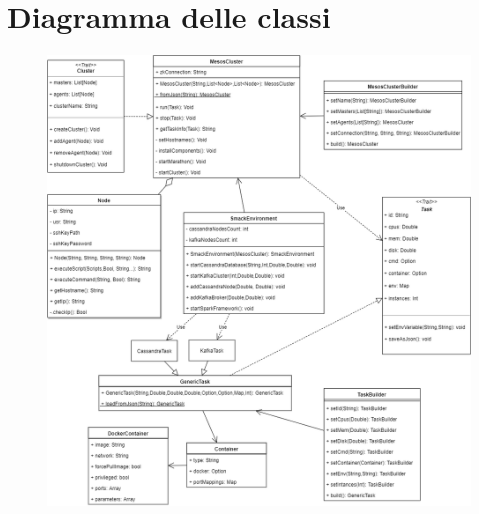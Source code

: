 \documentclass[12pt,a4paper]{article}
\begin{document}
    \newpage
    \section{Diagramma delle classi}\label{sec:diagrammaClassi}
    \begin{figure}[!h]
        \includegraphics[scale=0.5]{res/Class_Diagram_All.png}
    \end{figure}
    \restoregeometry
\end{document}
